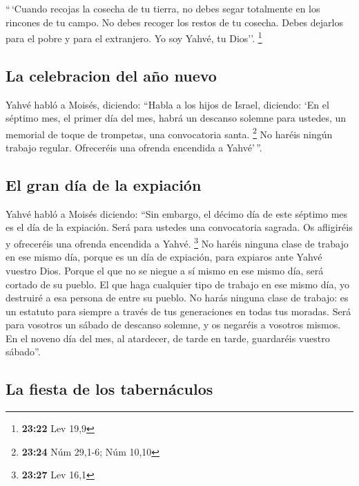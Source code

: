 \begin{paracol}{2}
 ``\,`Cuando recojas la cosecha de tu tierra, no debes
segar totalmente en los rincones de tu campo. No debes recoger los
restos de tu cosecha. Debes dejarlos para el pobre y para el extranjero.
Yo soy Yahvé, tu Dios''. \footnote{\textbf{23:22} Lev 19,9}

\hypertarget{la-celebracion-del-auxf1o-nuevo}{%
\subsection{La celebracion del año
nuevo}\label{la-celebracion-del-auxf1o-nuevo}}

 Yahvé habló a Moisés, diciendo:  ``Habla
a los hijos de Israel, diciendo: `En el séptimo mes, el primer día del
mes, habrá un descanso solemne para ustedes, un memorial de toque de
trompetas, una convocatoria santa. \footnote{\textbf{23:24} Núm 29,1-6;
  Núm 10,10}  No haréis ningún trabajo regular.
Ofreceréis una ofrenda encendida a Yahvé'\,''.

\hypertarget{el-gran-duxeda-de-la-expiaciuxf3n}{%
\subsection{El gran día de la
expiación}\label{el-gran-duxeda-de-la-expiaciuxf3n}}

 Yahvé habló a Moisés diciendo:  ``Sin
embargo, el décimo día de este séptimo mes es el día de la expiación.
Será para ustedes una convocatoria sagrada. Os afligiréis y ofreceréis
una ofrenda encendida a Yahvé. \footnote{\textbf{23:27} Lev 16,1}
 No haréis ninguna clase de trabajo en ese mismo día,
porque es un día de expiación, para expiaros ante Yahvé vuestro Dios.
 Porque el que no se niegue a sí mismo en ese mismo día,
será cortado de su pueblo.  El que haga cualquier tipo de
trabajo en ese mismo día, yo destruiré a esa persona de entre su pueblo.
 No harás ninguna clase de trabajo: es un estatuto para
siempre a través de tus generaciones en todas tus moradas.
 Será para vosotros un sábado de descanso solemne, y os
negaréis a vosotros mismos. En el noveno día del mes, al atardecer, de
tarde en tarde, guardaréis vuestro sábado''.

\hypertarget{la-fiesta-de-los-tabernuxe1culos}{%
\subsection{La fiesta de los
tabernáculos}\label{la-fiesta-de-los-tabernuxe1culos}}


\end{paracol}
